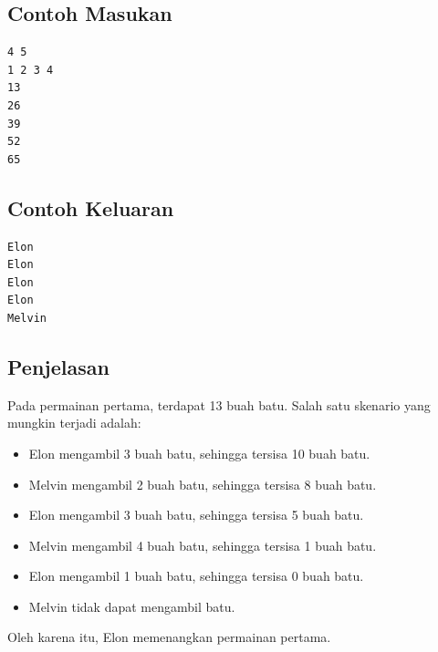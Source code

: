 \documentclass{article}
\begin{document}
\begin{multicols}{2}
\subsection*{Contoh Masukan}
\begin{lstlisting}
4 5
1 2 3 4
13
26
39
52
65

\end{lstlisting}
\columnbreak
\subsection*{Contoh Keluaran}
\begin{lstlisting}
Elon
Elon
Elon
Elon
Melvin
\end{lstlisting}
\vfill
\null
\end{multicols}

\subsection*{Penjelasan}
Pada permainan pertama, terdapat 13 buah batu. Salah satu skenario yang mungkin terjadi adalah:
\begin{itemize}
\item{Elon mengambil 3 buah batu, sehingga tersisa 10 buah batu.}
\item{Melvin mengambil 2 buah batu, sehingga tersisa 8 buah batu.}
\item{Elon mengambil 3 buah batu, sehingga tersisa 5 buah batu.}
\item{Melvin mengambil 4 buah batu, sehingga tersisa 1 buah batu.}
\item{Elon mengambil 1 buah batu, sehingga tersisa 0 buah batu.}
\item{Melvin tidak dapat mengambil batu.}
\end{itemize}
Oleh karena itu, Elon memenangkan permainan pertama.
\end{document}
